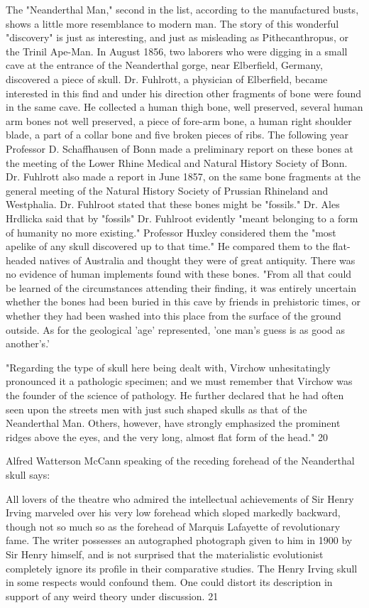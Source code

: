 The "Neanderthal Man," second in the list, according to the manufactured busts, shows a
little more resemblance to modern man. The story of this wonderful "discovery" is just as
interesting, and just as misleading as Pithecanthropus, or the Trinil Ape-Man. In August
1856, two laborers who were digging in a small cave at the entrance of the Neanderthal
gorge, near Elberfield, Germany, discovered a piece of skull. Dr. Fuhlrott, a physician of
Elberfield, became interested in this find and under his direction other fragments of bone
were found in the same cave. He collected a human thigh bone, well preserved, several
human arm bones not well preserved, a piece of fore-arm bone, a human right shoulder blade,
a part of a collar bone and five broken pieces of ribs. The following year Professor D.
Schaffhausen of Bonn made a preliminary report on these bones at the meeting of the Lower
Rhine Medical and Natural History Society of Bonn. Dr. Fuhlrott also made a report in June
1857, on the same bone fragments at the general meeting of the Natural History Society of
Prussian Rhineland and Westphalia. Dr. Fuhlroot stated that these bones might be "fossils."
Dr. Ales Hrdlicka said that by "fossils" Dr. Fuhlroot evidently "meant belonging to a form of
humanity no more existing." Professor Huxley considered them the "most apelike of any
skull discovered up to that time." He compared them to the flat-headed natives of Australia
and thought they were of great antiquity. There was no evidence of human implements found
with these bones. "From all that could be learned of the circumstances attending their
finding, it was entirely uncertain whether the bones had been buried in this cave by friends in
prehistoric times, or whether they had been washed into this place from the surface of the
ground outside. As for the geological 'age' represented, 'one man's guess is as good as
another's.'

"Regarding the type of skull here being dealt with, Virchow unhesitatingly pronounced it a
pathologic specimen; and we must remember that Virchow was the founder of the science of
pathology. He further declared that he had often seen upon the streets men with just such
shaped skulls as that of the Neanderthal Man. Others, however, have strongly emphasized the
prominent ridges above the eyes, and the very long, almost flat form of the head." 20

Alfred Watterson McCann speaking of the receding forehead of the Neanderthal skull says:

All lovers of the theatre who admired the intellectual achievements of Sir Henry Irving
marveled over his very low forehead which sloped markedly backward, though not so much
so as the forehead of Marquis Lafayette of revolutionary fame. The writer possesses an
autographed photograph given to him in 1900 by Sir Henry himself, and is not surprised that
the materialistic evolutionist completely ignore its profile in their comparative studies. The
Henry Irving skull in some respects would confound them. One could distort its description
in support of any weird theory under discussion. 21

